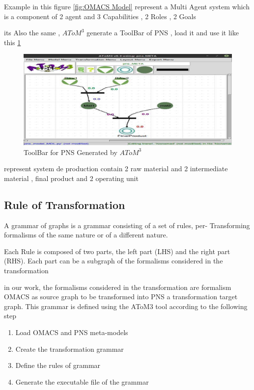 Example in this figure \ref{fig:OMACS Model} represent a Multi Agent system which is  a component of 2 agent and 3 Capabilities , 2 Roles , 2 Goals
\vspace{0.1cm}


its Also the same  , $AToM^3$ generate a ToolBar of PNS , load it and use it like this \ref{fig:PNS Model}

\begin{figure}[th]
	\centering
 	\includegraphics{Chapiter3/img/pnsMDL}
	\caption{\label{fig:PNS Model}ToolBar for PNS Generated by $AToM^3$}
\end{figure} 

represent system de production contain 2 raw material and 2 intermediate material , final product
and 2 operating unit 





\pagebreak
\subsection{ Rule of Transformation }
A grammar of graphs is a grammar consisting of a set of rules, per-
Transforming formalisms of the same nature or of a different nature. 

Each Rule is composed of two parts, the left part (LHS) and the right part (RHS).
Each part can be a subgraph of the formalisms considered in the transformation

in our work, the formalisms considered in the transformation are formalism
OMACS as source graph to be transformed into PNS a transformation target graph.
This grammar is defined using the AToM3 tool according to the following step

\begin{enumerate}
	\item Load OMACS and PNS meta-models
	\item Create the transformation grammar
	\item Define the rules of grammar
	\item Generate the executable file of the grammar
\end{enumerate}
 
